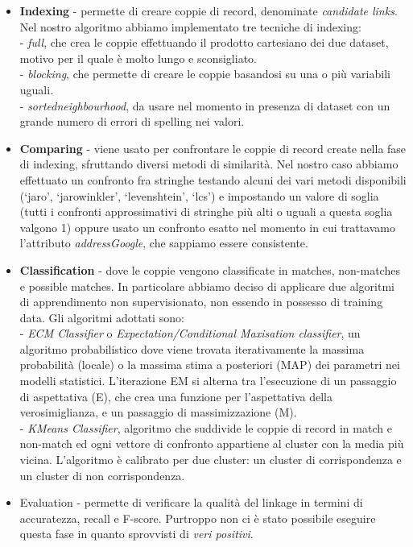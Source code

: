 \documentclass[a4paper,12pt]{article}
\begin{document}
\begin{itemize}
\item \textbf{Indexing} - permette di creare coppie di record, denominate \textit{candidate links}. Nel nostro algoritmo abbiamo implementato tre tecniche di indexing: \\
- \textit{full}, che crea le coppie effettuando il prodotto cartesiano dei due dataset, motivo per il quale è molto lungo e sconsigliato. \\
- \textit{blocking}, che permette di creare le coppie basandosi su una o più variabili uguali. \\
- \textit{sortedneighbourhood}, da usare nel momento in presenza di dataset con un grande numero di errori di spelling nei valori.
\item \textbf{Comparing} - viene usato per confrontare le coppie di record create nella fase di indexing, sfruttando diversi metodi di similarità. Nel nostro caso abbiamo effettuato un confronto fra stringhe testando alcuni dei vari metodi disponibili (‘jaro’, ‘jarowinkler’, ‘levenshtein’, ‘lcs’) e impostando un valore di soglia (tutti i confronti approssimativi di stringhe più alti o uguali a questa soglia valgono 1) oppure usato un confronto esatto nel momento in cui trattavamo l'attributo \textit{addressGoogle}, che sappiamo essere consistente.
\item \textbf{Classification} - dove le coppie vengono classificate in matches, non-matches e possible matches. In particolare abbiamo deciso di applicare due algoritmi di apprendimento non supervisionato, non essendo in possesso di training data. Gli algoritmi adottati sono: \\
- \textit{ECM Classifier} o \textit{Expectation/Conditional Maxisation classifier}, un algoritmo probabilistico dove viene trovata iterativamente la massima probabilità (locale) o la massima stima a posteriori (MAP) dei parametri nei modelli statistici. L'iterazione EM si alterna tra l'esecuzione di un passaggio di aspettativa (E), che crea una funzione per l'aspettativa della verosimiglianza, e un passaggio di massimizzazione (M). \\
- \textit{KMeans Classifier}, algoritmo che suddivide le coppie di record in match e non-match ed ogni vettore di confronto appartiene al cluster con la media più vicina. L'algoritmo è calibrato per due cluster: un cluster di corrispondenza e un cluster di non corrispondenza.
\item {Evaluation} - permette di verificare la qualità del linkage in termini di accuratezza, recall e F-score. Purtroppo non ci è stato possibile eseguire questa fase in quanto sprovvisti di \textit{veri positivi}.
\end{itemize}
\end{document}
